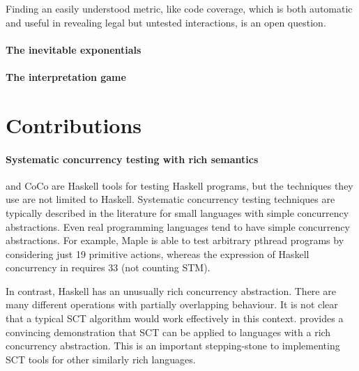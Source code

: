 Finding an easily understood metric, like code coverage, which is both
automatic and useful in revealing legal but untested interactions, is
an open question.

\paragraph{The inevitable exponentials}
\todo{\ldots}

\paragraph{The interpretation game}
\todo{\ldots}

\section{Contributions}
\label{sec:conclusions-contributions}

\paragraph{Systematic concurrency testing with rich semantics}
\dejafu{} and CoCo are Haskell tools for testing Haskell programs, but
the techniques they use are not limited to Haskell.  Systematic
concurrency testing techniques are typically described in the
literature for small languages with simple concurrency abstractions.
Even real programming languages tend to have simple concurrency
abstractions.  For example, Maple\cite{yu2012} is able to test
arbitrary pthread programs by considering just 19 primitive actions,
whereas the expression of Haskell concurrency in \dejafu{} requires 33
(not counting STM).

In contrast, Haskell has an unusually rich concurrency abstraction.
There are many different operations with partially overlapping
behaviour.  It is not clear that a typical SCT algorithm would work
effectively in this context.  \dejafu{} provides a convincing
demonstration that SCT can be applied to languages with a rich
concurrency abstraction.  This is an important stepping-stone to
implementing SCT tools for other similarly rich languages.
